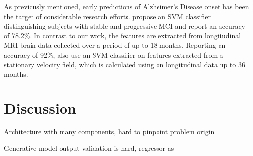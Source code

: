 As previously mentioned, early predictions of Alzheimer's Disease onset has been the target of considerable research efforts. \cite{thung2016identification} propose an SVM classifier distinguishing subjects with stable and progressive MCI and report an accuracy of 78.2\%. In contrast to our work, the features are extracted from longitudinal MRI brain data collected over a period of up to 18 months.
Reporting an accuracy of 92\%, \cite{sun2017detection} also use an SVM classifier on features extracted from a stationary velocity field, which is calculated using \cite{vercauteren2009diffeomorphic} on longitudinal data up to 36 months.

\chapter{Discussion}
Architecture with many components, hard to pinpoint problem origin

Generative model output validation is hard, regressor as 
